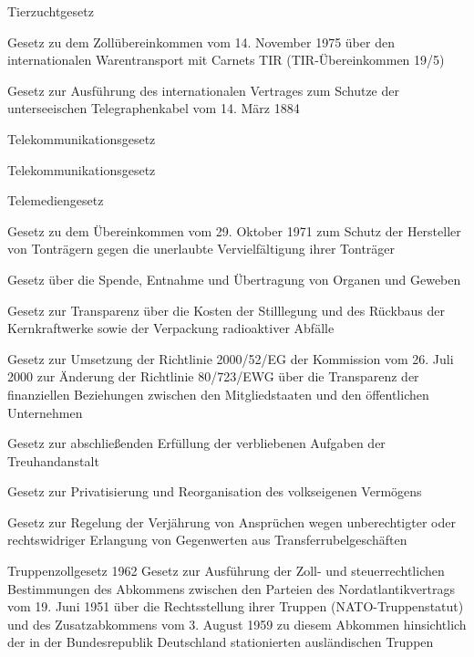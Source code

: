 \item[{TierZG-2019}] Tierzuchtgesetz

\item[{TIRÜbk1975G}] Gesetz zu dem Zollübereinkommen vom 14. November 1975 über den internationalen Warentransport mit Carnets TIR (TIR-Übereinkommen 19/5)

\item[{TKabelVtrAG}] Gesetz zur Ausführung des internationalen Vertrages zum Schutze der unterseeischen Telegraphenkabel vom 14. März 1884

\item[{TKG}] Telekommunikationsgesetz

\item[{TKG-2004}] Telekommunikationsgesetz

\item[{TMG}] Telemediengesetz

\item[{TonTrÜbkG}] Gesetz zu dem Übereinkommen vom 29. Oktober 1971 zum Schutz der Hersteller von Tonträgern gegen die unerlaubte Vervielfältigung ihrer Tonträger

\item[{TPG}] Gesetz über die Spende, Entnahme und Übertragung von Organen und Geweben

\item[{TransparenzG}] Gesetz zur Transparenz über die Kosten der Stilllegung und des Rückbaus der Kernkraftwerke sowie der Verpackung radioaktiver Abfälle

\item[{TranspRLG}] Gesetz zur Umsetzung der Richtlinie 2000/52/EG der Kommission vom 26. Juli 2000 zur Änderung der Richtlinie 80/723/EWG über die Transparenz der finanziellen Beziehungen zwischen den Mitgliedstaaten und den öffentlichen Unternehmen

\item[{TreuhAbschlG}] Gesetz zur abschließenden Erfüllung der verbliebenen Aufgaben der Treuhandanstalt

\item[{TreuhG}] Gesetz zur Privatisierung und Reorganisation des volkseigenen Vermögens

\item[{TrVerjG}] Gesetz zur Regelung der Verjährung von Ansprüchen wegen unberechtigter oder rechtswidriger Erlangung von Gegenwerten aus Transferrubelgeschäften

\item[{TrZG-1962}] Truppenzollgesetz 1962 Gesetz zur Ausführung der Zoll- und steuerrechtlichen Bestimmungen des Abkommens zwischen den Parteien des Nordatlantikvertrags vom 19. Juni 1951 über die Rechtsstellung ihrer Truppen (NATO-Truppenstatut) und des Zusatzabkommens vom 3. August 1959 zu diesem Abkommen hinsichtlich der in der Bundesrepublik Deutschland stationierten ausländischen Truppen

